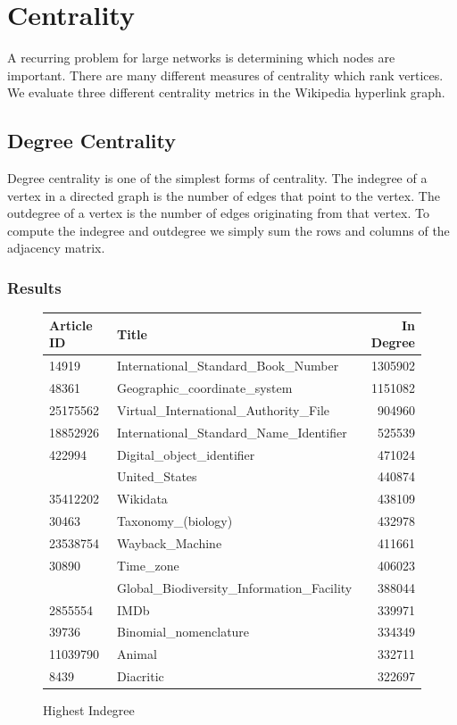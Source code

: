 \documentclass{article}
\begin{document}
\section{Centrality}

A recurring problem for large networks is determining which nodes are important.
There are many different measures of centrality which rank vertices. 
We evaluate three different centrality metrics in the Wikipedia hyperlink graph.



\subsection{Degree Centrality}

Degree centrality is one of the simplest forms of centrality.
The indegree of a vertex in a directed graph is the number of edges that point to the vertex.
The outdegree of a vertex is the number of edges originating from that vertex.
To compute the indegree and outdegree we simply sum the rows and columns of the adjacency matrix.

\subsubsection{Results}
\begin{figure}[H]
    \centering
    \caption{Highest Indegree}
    \begin{tabular}{llr}
        \toprule
        Article ID & Title & In Degree\\
        \midrule
        14919 & International\_Standard\_Book\_Number & 1305902\\
        48361 & Geographic\_coordinate\_system & 1151082\\
        25175562 & Virtual\_International\_Authority\_File & 904960\\
        18852926 & International\_Standard\_Name\_Identifier & 525539\\
        422994 & Digital\_object\_identifier & 471024\\
        \addlinespace
        3434750 & United\_States & 440874\\
        35412202 & Wikidata & 438109\\
        30463 & Taxonomy\_(biology) & 432978\\
        23538754 & Wayback\_Machine & 411661\\
        30890 & Time\_zone & 406023\\
        \addlinespace
        2987862 & Global\_Biodiversity\_Information\_Facility & 388044\\
        2855554 & IMDb & 339971\\
        39736 & Binomial\_nomenclature & 334349\\
        11039790 & Animal & 332711\\
        8439 & Diacritic & 322697\\
        \bottomrule
    \end{tabular}
\end{figure}
    
\end{document}
